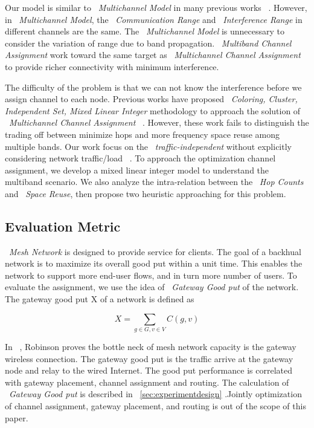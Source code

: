 Our model is similar to ~\emph{Multichannel Model} in many previous works ~\cite{tang2005interference,yuan2006cross,si2010overview}. However, in ~\emph{Multichannel Model}, the ~\emph{Communication Range} and ~\emph{Interference Range} in different channels are the same. The ~\emph{Multichannel Model} is unnecessary to consider the variation of range due to band propagation.
~\emph{Multiband Channel Assignment} work toward the same target as ~\emph{Multichannel Channel Assignment} to provide richer connectivity with minimum interference.

The difficulty of the problem is that we can not know the interference before we assign channel to each node. Previous works have proposed ~\emph{Coloring, Cluster, Independent Set, Mixed Linear Integer} methodology to approach the solution of ~\emph{Multichannel Channel Assignment} ~\cite{mishra2005weighted,peng2012efficient,tang2005interference}. 
However, these work fails to distinguish the trading off between minimize hops and more frequency space reuse among multiple bands.
Our work focus on the ~\emph{traffic-independent} 
without explicitly considering network traffic/load ~\cite{marina2010topology}.
To approach the optimization channel assignment, we develop a mixed linear integer model to understand the multiband scenario. We also analyze the intra-relation between the ~\emph{Hop Counts} and ~\emph{Space Reuse}, then propose two heuristic approaching for this problem.

\subsection{Evaluation Metric}
\label{subsec:metric}
~\emph{Mesh Network} is designed to provide service for clients. The goal of a backhual network is to maximize its overall good put within a unit time. 
This enables the network to support more end-user flows, and in turn more number of users. To evaluate the assignment, we use the idea of ~\emph{Gateway Good put} of the network. The gateway good put X of a network is defined as

\begin{equation}
\label{eq:goodput}
X=\sum_{g \in G, v \in V}C(g,v)
\end{equation}

In ~\cite{robinson2008adding}, Robinson proves the bottle neck of mesh network capacity is the gateway wireless connection. 
The gateway good put is the traffic arrive at the gateway node and relay to the wired Internet. The good put performance is correlated with gateway placement, channel assignment and routing. 
The calculation of ~\emph{Gateway Good put} is described in ~\ref{sec:experimentdesign} .Jointly optimization of channel assignment, gateway placement, and routing is out of the scope of this paper.

